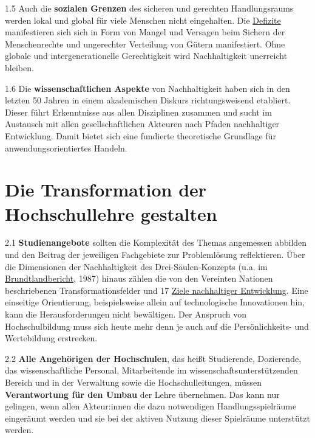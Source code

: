 \documentclass[DIV=12]{scrartcl}
\begin{document}
1.5 Auch die \textbf{sozialen Grenzen} des sicheren und gerechten
Handlungsraums werden lokal und global für viele Menschen nicht
eingehalten. Die
\href{https://www-cdn.oxfam.org/s3fs-public/file_attachments/dp-a-safe-and-just-space-for-humanity-130212-en_5.pdf}{Defizite}
manifestieren sich sich in Form von Mangel und Versagen beim Sichern der
Menschenrechte und ungerechter Verteilung von Gütern manifestiert. Ohne
globale und intergenerationelle Gerechtigkeit wird Nachhaltigkeit
unerreicht bleiben.

1.6 Die \textbf{wissenschaftlichen Aspekte} von Nachhaltigkeit haben
sich in den letzten 50 Jahren in einem akademischen Diskurs
richtungsweisend etabliert. Dieser führt Erkenntnisse aus allen
Disziplinen zusammen und sucht im Austausch mit allen gesellschaftlichen
Akteuren nach Pfaden nachhaltiger Entwicklung. Damit bietet sich eine
fundierte theoretische Grundlage für anwendungsorientiertes Handeln.

\hypertarget{die-transformation-der-hochschullehre-gestalten}{%
\section{Die Transformation der Hochschullehre
gestalten}\label{die-transformation-der-hochschullehre-gestalten}}

2.1 \textbf{Studienangebote} sollten die Komplexität des Themas
angemessen abbilden und den Beitrag der jeweiligen Fachgebiete zur
Problemlösung reflektieren. Über die Dimensionen der Nachhaltigkeit des
Drei-Säulen-Konzepts (u.a. im
\href{https://sustainabledevelopment.un.org/content/documents/5987our-common-future.pdf}{Brundtlandbericht},
1987) hinaus zählen die von den Vereinten Nationen beschriebenen
Transformationsfelder und 17 \href{https://sdgs.un.org/goals}{Ziele
nachhaltiger Entwicklung}. Eine einseitige Orientierung, beispielsweise
allein auf technologische Innovationen hin, kann die Herausforderungen
nicht bewältigen. Der Anspruch von Hochschulbildung muss sich heute mehr
denn je auch auf die Persönlichkeits- und Wertebildung erstrecken.

2.2 \textbf{Alle Angehörigen der Hochschulen}, das heißt Studierende,
Dozierende, das wissenschaftliche Personal, Mitarbeitende im
wissenschaftsunterstützenden Bereich und in der Verwaltung sowie die
Hochschulleitungen, müssen \textbf{Verantwortung für den Umbau} der
Lehre übernehmen. Das kann nur gelingen, wenn allen Akteur:innen die
dazu notwendigen Handlungsspielräume eingeräumt werden und sie bei der
aktiven Nutzung dieser Spielräume unterstützt werden.
\end{document}
